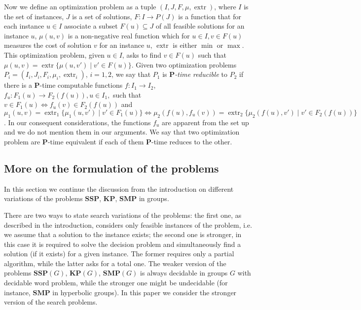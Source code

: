 \documentclass[10pt]{amsart}
\theoremstyle{definition}
\def\P{{\mathbf{P}}}
\def\SSP{{\mathbf{SSP}}}
\def\SMP{{\mathbf{SMP}}}
\def\KP{{\mathbf{KP}}}
\begin{document}
Now we define an optimization problem as a  tuple $(I,J, F,\mu,{\mathop{\mathrm{extr}}})$, where $I$ is the set of instances, $J$ is a set of solutions, $F:I \to P(J)$ is a function that for each instance $u \in I$ associate a subset  $F(u)\subseteq J$  of all feasible solutions for an instance $u$, $\mu(u,v)$ is a non-negative real function  which for $u \in I, v \in F(u)$ measures the cost of solution $v$ for an instance $u$,  ${\mathop{\mathrm{extr}}}$ is either $\min$ or $\max$. This optimization problem, given $u\in I$, asks to find $v\in F(u)$ such that $\mu(u,v)={\mathop{\mathrm{extr}}}\{\mu(u,v')\mid v'\in F(u)\}$. Given two optimization problems $P_i=(I_i,J_i, F_i,\mu_i,{\mathop{\mathrm{extr}}}_i)$, $i=1,2$, we say that $P_1$ is {\em $\P$-time reducible} to $P_2$ if there is a $\P$-time computable functions $f:I_1\to I_2$, $f_u:F_1(u)\to F_2(f(u)), u\in I_1,$ such that $v\in F_1(u)\iff f_u(v)\in F_2(f(u))$ and $\mu_1(u,v)={\mathop{\mathrm{extr}}}_1\{\mu_1(u,v')\mid v'\in F_1(u)\} \Longleftrightarrow \mu_2(f(u),f_u(v))={\mathop{\mathrm{extr}}}_2\{\mu_2(f(u),v')\mid v'\in F_2(f(u))\}$. In our consequent considerations, the functions $f_u$ are apparent from the set up and we do not mention them in our arguments. We say that two optimization problem are $\P$-time equivalent if each of them $\P$-time reduces to the other.


\subsection{More on the formulation of the problems}
\label{se:formulation}
In this section we continue the discussion from the introduction on  different variations of the problems $\SSP$, $\KP$, $\SMP$ in groups.

There are two ways to state search variations of the problems: the first one, as described  in the introduction, considers only feasible instances of the problem, i.e.
we assume that a solution to the instance exists; the second one is stronger, in this case it is required to solve the decision problem and simultaneously find a solution (if it exists) for a given instance. The former requires only a partial algorithm, while the latter asks for a total one. The weaker version of the problems $\SSP(G)$, $\KP(G)$, $\SMP(G)$ is always decidable in groups $G$  with decidable word problem, while the stronger one might be undecidable (for instance, $\SMP$ in hyperbolic groups). In this paper we consider the stronger version of the search problems.
\end{document}
